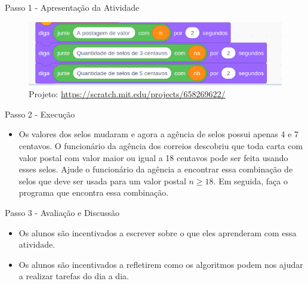 \documentclass{beamer}
\begin{document}
\begin{frame}{Passo 1 - Apresentação da Atividade}


\begin{figure}
\begin{center}
	\includegraphics[scale=0.5]{images/output.png} 
\end{center}
\caption{Projeto: \url{https://scratch.mit.edu/projects/658269622/}}
\end{figure}



\end{frame}


\begin{frame}{Passo 2 - Execução}

\begin{itemize}
    \item Os valores dos selos mudaram e agora a agência de selos possui apenas 4 e 7 centavos. O funcionário da agência dos correios descobriu que toda carta com valor postal com valor maior ou igual a 18 centavos pode ser feita usando esses selos. Ajude o funcionário da agência a encontrar essa combinação de selos que deve ser usada para um valor postal $n \geq 18$. Em seguida, faça o programa que encontra essa combinação.
\end{itemize}



\end{frame}


\begin{frame}{Passo 3 - Avaliação e Discussão}

\begin{itemize}
\item<1-> Os alunos são incentivados a escrever sobre o que eles aprenderam com essa atividade.

\item<2-> Os alunos são incentivados a refletirem como os algoritmos podem nos ajudar a realizar tarefas do dia a dia. 
 
\end{itemize}




\end{frame}
\end{document}
